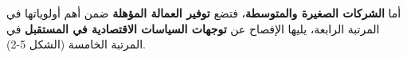 أما \textbf{الشركات الصغيرة والمتوسطة}، فتضع \textbf{توفير العمالة المؤهلة} ضمن أهم أولوياتها في المرتبة الرابعة، يليها الإفصاح عن \textbf{توجهات السياسات الاقتصادية في المستقبل} في المرتبة الخامسة (الشكل 5-2).
